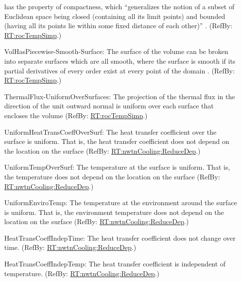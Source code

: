 \documentclass[12pt]{article}
\begin{document}
\begin{itemize}
{has the property of compactness, which ``generalizes the notion of a subset of
Euclidean space being closed (containing all its limit points) and bounded
(having all its points lie within some fixed distance of each other)''
\cite{Wiki-CompactSpace2022}. (RefBy:
\hyperref[RT:rocTempSimp]{RT:rocTempSimp}.)}
\item[VolHasPiecewise-Smooth-Surface:\phantomsection\label{assumpPiecewiseSmooth}]
{The surface of the volume can be broken into separate surfaces which are all
smooth, where the surface is smooth if its partial derivatives of every order
exist at every point of the domain \cite{Wiki-DiffGeom2022}. (RefBy:
\hyperref[RT:rocTempSimp]{RT:rocTempSimp}.)}
\item[ThermalFlux-UniformOverSurfaces:\phantomsection\label{assumpUnifThermFlux}]
{The projection of the thermal flux in the direction of the unit outward normal
is uniform over each surface that encloses the volume (RefBy:
\hyperref[RT:rocTempSimp]{RT:rocTempSimp}.)}
\item[UniformHeatTransCoeffOverSurf:\phantomsection\label{assumpUnifHeatTransCoeff}]
{The heat transfer coefficient over the surface is uniform.  That is, the heat
transfer coefficient does not depend on the location on the surface (RefBy:
\hyperref[RT:nwtnCooling:ReduceDep]{RT:nwtnCooling:ReduceDep}.)}
\item[UniformTempOverSurf:\phantomsection\label{assumpUnifTempSurf}]
{The temperature at the surface is uniform.  That is, the temperature does not
depend on the location on the surface (RefBy:
\hyperref[RT:nwtnCooling:ReduceDep] {RT:nwtnCooling:ReduceDep}.)}
\item[UniformEnviroTemp:\phantomsection\label{assumpUnifEnviroTempSurf}]
{The temperature at the environment around the surface is uniform.  That is, the
environment temperature does not depend on the location on the surface (RefBy:
\hyperref[RT:nwtnCooling:ReduceDep] {RT:nwtnCooling:ReduceDep}.)}
\item[HeatTransCoeffIndepTime:\phantomsection\label{assumpHeatTransIndepTime}]
{The heat transfer coefficient does not change over time. (RefBy:
\hyperref[RT:nwtnCooling:ReduceDep] {RT:nwtnCooling:ReduceDep}.)}
\item[HeatTransCoeffIndepTemp:\phantomsection\label{assumpHeatTransIndepTemp}]
{The heat transfer coefficient is independent of temperature. (RefBy:
\hyperref[RT:nwtnCooling:ReduceDep] {RT:nwtnCooling:ReduceDep}.)}

\end{itemize}
\end{document}
